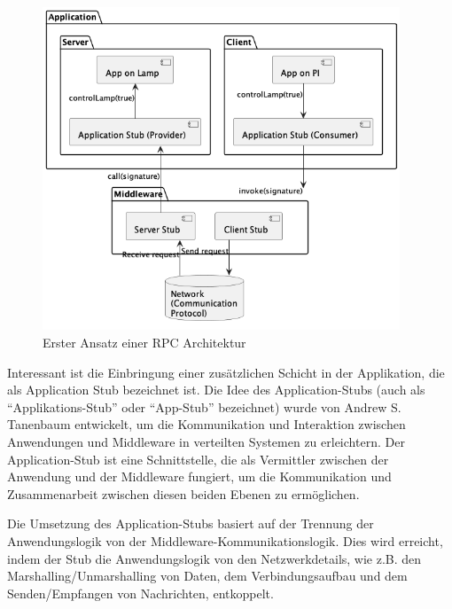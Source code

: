 \begin{figure}[!ht]
  \centering
  \includegraphics[width=0.95\textwidth]{fig/uml/rpc-simple.png}
  \caption{Erster Ansatz einer RPC Architektur}
  \label{fig:simple-rpc}
\end{figure}

Interessant ist die Einbringung einer zusätzlichen Schicht in der Applikation, die als Application Stub bezeichnet ist. Die Idee des Application-Stubs (auch als \enquote{Applikations-Stub} oder \enquote{App-Stub} bezeichnet) wurde von Andrew S. Tanenbaum entwickelt, um die Kommunikation und Interaktion zwischen Anwendungen und Middleware in verteilten Systemen zu erleichtern. Der Application-Stub ist eine Schnittstelle, die als Vermittler zwischen der Anwendung und der Middleware fungiert, um die Kommunikation und Zusammenarbeit zwischen diesen beiden Ebenen zu ermöglichen.

Die Umsetzung des Application-Stubs basiert auf der Trennung der Anwendungslogik von der Middleware-Kommunikationslogik. Dies wird erreicht, indem der Stub die Anwendungslogik von den Netzwerkdetails, wie z.B. den Marshalling/Unmarshalling von Daten, dem Verbindungsaufbau und dem Senden/Empfangen von Nachrichten, entkoppelt.

